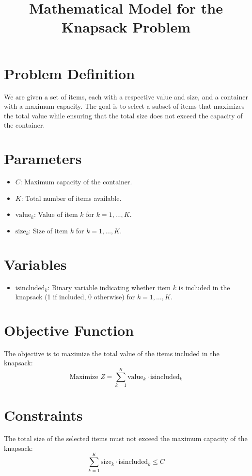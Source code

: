 \documentclass{article}
\begin{document}
\title{Mathematical Model for the Knapsack Problem}
\author{}
\date{}
\maketitle

\section{Problem Definition}
We are given a set of items, each with a respective value and size, and a container with a maximum capacity. The goal is to select a subset of items that maximizes the total value while ensuring that the total size does not exceed the capacity of the container.

\section{Parameters}
\begin{itemize}
    \item \( C \): Maximum capacity of the container.
    \item \( K \): Total number of items available.
    \item \( \text{value}_k \): Value of item \( k \) for \( k = 1, \ldots, K \).
    \item \( \text{size}_k \): Size of item \( k \) for \( k = 1, \ldots, K \).
\end{itemize}

\section{Variables}
\begin{itemize}
    \item \( \text{isincluded}_k \): Binary variable indicating whether item \( k \) is included in the knapsack (1 if included, 0 otherwise) for \( k = 1, \ldots, K \).
\end{itemize}

\section{Objective Function}
The objective is to maximize the total value of the items included in the knapsack:
\[
\text{Maximize } Z = \sum_{k=1}^{K} \text{value}_k \cdot \text{isincluded}_k
\]

\section{Constraints}
The total size of the selected items must not exceed the maximum capacity of the knapsack:
\[
\sum_{k=1}^{K} \text{size}_k \cdot \text{isincluded}_k \leq C
\]
\end{document}
